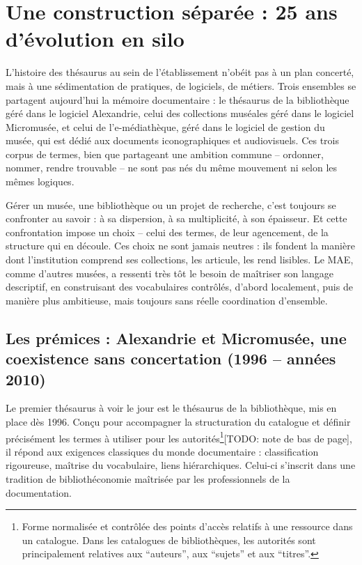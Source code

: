 \section{\label{II-A-1}Une construction séparée : 25 ans d'évolution en silo}

L’histoire des thésaurus au sein de l’établissement n’obéit pas à un plan concerté, mais à une sédimentation de pratiques, de logiciels, de métiers. Trois ensembles se partagent aujourd’hui la mémoire documentaire : le thésaurus de la bibliothèque géré dans le logiciel Alexandrie, celui des collections muséales géré dans le logiciel Micromusée, et celui de l’e-médiathèque, géré dans le logiciel de gestion du musée, qui est dédié aux documents iconographiques et audiovisuels. Ces trois corpus de termes, bien que partageant une ambition commune – ordonner, nommer, rendre trouvable – ne sont pas nés du même mouvement ni selon les mêmes logiques.

Gérer un musée, une bibliothèque ou un projet de recherche, c’est toujours se confronter au savoir : à sa dispersion, à sa multiplicité, à son épaisseur. Et cette confrontation impose un choix – celui des termes, de leur agencement, de la structure qui en découle. Ces choix ne sont jamais neutres : ils fondent la manière dont l’institution comprend ses collections, les articule, les rend lisibles. Le MAE, comme d’autres musées, a ressenti très tôt le besoin de maîtriser son langage descriptif, en construisant des vocabulaires contrôlés, d’abord localement, puis de manière plus ambitieuse, mais toujours sans réelle coordination d’ensemble.

\subsection{Les prémices : Alexandrie et Micromusée, une coexistence sans concertation (1996 – années 2010)}

Le premier thésaurus à voir le jour est le thésaurus de la bibliothèque, mis en place dès 1996. Conçu pour accompagner la structuration du catalogue et définir précisément les termes à utiliser pour les autorités\footnote{Forme normalisée et contrôlée des points d’accès relatifs à une ressource dans un catalogue. Dans les catalogues de bibliothèques, les autorités sont principalement relatives aux “auteurs”, aux “sujets” et aux “titres”.}[TODO: note de bas de page], il répond aux exigences classiques du monde documentaire : classification rigoureuse, maîtrise du vocabulaire, liens hiérarchiques. Celui-ci s’inscrit dans une tradition de bibliothéconomie maîtrisée par les professionnels de la documentation.

